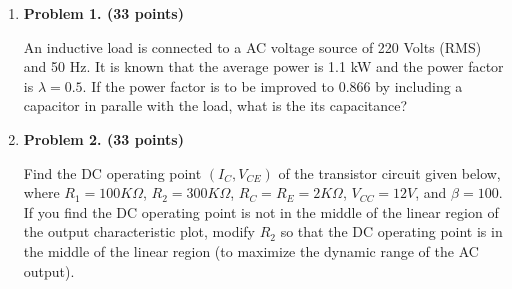 \begin{enumerate}

\item {\bf Problem 1. (33 points)} 


An inductive load is connected to a AC voltage source of 220 Volts (RMS)
and 50 Hz. It is known that the average power is 1.1 kW and the power
factor is $\lambda=0.5$. If the power factor is to be improved to 0.866 
by including a capacitor in paralle with the load, what is the its
capacitance?



\item {\bf Problem 2. (33 points)} 

Find the DC operating point $(I_C, V_{CE})$ of the transistor circuit 
given below, where $R_1=100K\Omega$, $R_2=300K\Omega$, $R_C=R_E=2K\Omega$, 
$V_{CC}=12V$, and $\beta=100$. If you find the DC operating point is not 
in the middle of the linear region of the output characteristic plot, 
modify $R_2$ so that the DC operating point is in the middle of the linear
region (to maximize the dynamic range of the AC output).


\end{enumerate}
